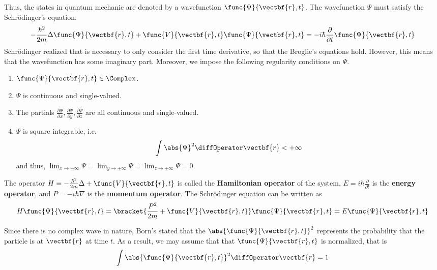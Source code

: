Thus, the states in quantum mechanic are denoted by a wavefunction \(\func{\Psi}{\vectbf{r},t}\). The wavefunction \(\Psi\) must satisfy the Schr\"{o}dinger's equation.
\begin{equation*}
    -\dfrac{\hbar^2}{2m} \Delta \func{\Psi}{\vectbf{r},t} + \func{V}{\vectbf{r},t} \func{\Psi}{\vectbf{r},t} = -i\hbar \dfrac{\partial}{\partial t} \func{\Psi}{\vectbf{r},t}
\end{equation*}
Schr\"{o}dinger realized that is necessary to only consider the first time derivative, so that the Broglie's equations hold. However, this means that the wavefunction has some imaginary part. Moreover, we impose the following regularity conditions on \(\Psi\).
\begin{enumerate}
    \item \(\func{\Psi}{\vectbf{r},t} \in \Complex\).
    \item \(\Psi\) is continuous and single-valued.
    \item The partials \(\frac{\partial \Psi}{\partial x},\frac{\partial \Psi}{\partial y},\frac{\partial \Psi}{\partial z}\) are all continuous and single-valued.
    \item \(\Psi\) is square integrable, i.e.
          \begin{equation*}
              \int \abs{\Psi}^2 \diffOperator \vectbf{r}< + \infty
          \end{equation*}
          and thus, \(\lim_{x \to \pm \infty} \Psi = \lim_{y \to \pm \infty} \Psi = \lim_{z \to \pm \infty} \Psi = 0\).
\end{enumerate}

The operator \(H = -\frac{\hbar^2}{2m} \Delta + \func{V}{\vectbf{r},t}\) is called the \textbf{Hamiltonian operator} of the system, \(E = i\hbar \frac{\partial}{\partial t}\) is the \textbf{energy operator}, and \(P = -i\hbar \nabla\) is the \textbf{momentum operator}. The Schr\"{o}dinger equation can be written as
\begin{equation*}
    H \func{\Psi}{\vectbf{r},t} = \bracket{ \frac{P^2}{2m}  + \func{V}{\vectbf{r},t}} \func{\Psi}{\vectbf{r},t} = E \func{\Psi}{\vectbf{r},t}
\end{equation*}

Since there is no complex wave in nature, Born's stated that the \(\abs{\func{\Psi}{\vectbf{r},t}}^2\) represents the probability that the particle is at \(\vectbf{r}\) at time \(t\). As a result, we may assume that that \(\func{\Psi}{\vectbf{r},t}\) is normalized, that is
\begin{equation*}
    \int \abs{\func{\Psi}{\vectbf{r},t}}^2 \diffOperator \vectbf{r} = 1
\end{equation*}

